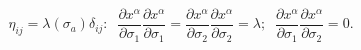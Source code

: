 \begin{equation}
\label{iso}
\eta_{ij}=\lambda(\sigma_a)\delta_{ij}:\;\;\frac{\partial x^{\alpha}}{\partial \sigma_1}\frac{\partial x^{\alpha}}{\partial \sigma_1}=\frac{\partial x^{\alpha}}{\partial \sigma_2}\frac{\partial x^{\alpha}}{\partial \sigma_2}=\lambda ;\;\;\frac{\partial x^{\alpha}}{\partial \sigma_1}\frac{\partial x^{\alpha}}{\partial \sigma_2}=0.
\end{equation}

